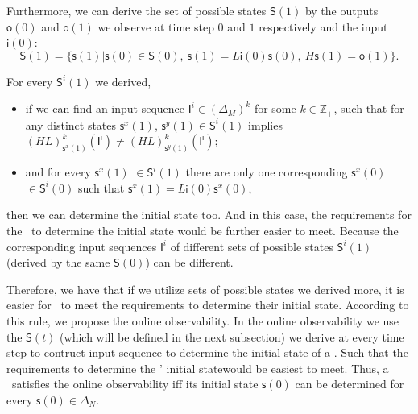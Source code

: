 Furthermore, we can derive the set of possible states $\mathsf{S}(1)$ by the outputs $\mathsf{o}(0)$ and $\mathsf{o}(1)$ we observe at time step $0$ and $1$ respectively and the input $\mathsf{i}(0)$:
\[\mathsf{S}(1)=\{\mathsf{s}(1)|\mathsf{s}(0)\in \mathsf{S}(0),\ \mathsf{s}(1)=L{\mathsf{i}(0)}{\mathsf{s}(0)},\ H \mathsf{s}(1)=\mathsf{o}(1)\}.\]

For every $\mathsf{S}^{i}(1)$ we derived, 
\begin{itemize}
  \item if we can find an input sequence $\mathsf{I}^{i}\in(\Delta_M)^k$ for some $k\in \mathbb{Z}_+$, such that for any distinct states $\mathsf{s}^{x}(1)$, $\mathsf{s}^{y}(1) \in \mathsf{S}^{i}(1)$ implies $(HL)^k_{\mathsf{s}^{x}(1)}(\mathsf{I^i})\neq (HL)^k_{\mathsf{s}^{y}(1)}(\mathsf{I^i})$;
  \item  and for every $\mathsf{s}^{x}(1)$ $\in \mathsf{S}^{i}(1)$ there are only one corresponding $\mathsf{s}^{x}(0)$ $\in \mathsf{S}^{i}(0)$ such that $\mathsf{s}^{x}(1)=L{\mathsf{i}(0)}{\mathsf{s}^{x}(0)}$,
\end{itemize} 
then we can determine the initial state too. And in this case, the requirements for the \BCN\ to determine the initial state would be further easier to meet. Because the corresponding input sequences $\mathsf{I}^{i}$ of different sets of possible states $\mathsf{S}^{i}(1)$ (derived by the same $\mathsf{S}(0)$) can be different. 

Therefore, we have that if we utilize sets of possible states we derived more, it is easier for \BCNs\ to meet the requirements to determine their initial state. According to this rule, we propose the online observability. In the online observability we use the $\mathsf{S}(t)$ (which will be defined in the next subsection) we derive at every time step to contruct input sequence to determine the initial state of a \BCN. Such that the requirements to determine the \BCNs' initial statewould be easiest to meet. Thus, a \BCN\ satisfies the online observability iff its initial state $\mathsf{s}(0)$ can be determined for every $\mathsf{s}(0) \in \Delta_N$.


